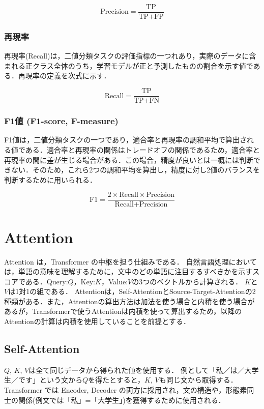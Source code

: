 $$
\text{Precision} = \frac{\text{TP}}{\text{TP}+\text{FP}}
$$

\subsubsection{再現率 \label{c4s2-1c}}
再現率(Recall)は，二値分類タスクの評価指標の一つれあり，実際のデータに含まれる正クラス全体のうち，学習モデルが正と予測したものの割合を示す値である．再現率の定義を次式に示す．

$$
\text{Recall} = \frac{\text{TP}}{\text{TP}+\text{FN}}
$$

\subsubsection{F1値 (F1-score, F-measure) \label{c4s2-1d}}
F1値は，二値分類タスクの一つであり，適合率と再現率の調和平均で算出される値である．適合率と再現率の関係はトレードオフの関係であるため，適合率と再現率の間に差が生じる場合がある．この場合，精度が良いとは一概には判断できない．そのため，これら2つの調和平均を算出し，精度に対し2値のバランスを判断するために用いられる．

$$
\text{F1} = \frac{2 \times \text{Recall} \times \text{Precision}}{\text{Recall}+\text{Precision}}
$$

\section{Attention \label{c4s3}}
Attention は，Transformer の中枢を担う仕組みである．
自然言語処理においては，単語の意味を理解するために，文中のどの単語に注目するすべきかを示すスコアである．Query:${Q}$，Key:${K}$，Value:${V}$の3つのベクトルから計算される．
${K}$と${V}$は1対1の組である．
Attentionは，Self-AttentionとSource-Target-Attentionの2種類がある．また，Attentionの算出方法は加法を使う場合と内積を使う場合があるが，Transformerで使うAttentionは内積を使って算出するため，以降のAttentionの計算は内積を使用していることを前提とする．

\subsection{Self-Attention \label{c4s3-1a}}
${Q}$, ${K}$, ${V}$は全て同じデータから得られた値を使用する．
例として「私／は／大学生／です」という文から${Q}$を得たとすると，${K}$, ${V}$も同じ文から取得する．Transformer では Encoder, Decoder の両方に採用され，文の構造や，形態素同士の関係(例文では「私」=「大学生」)を獲得するために使用される．


